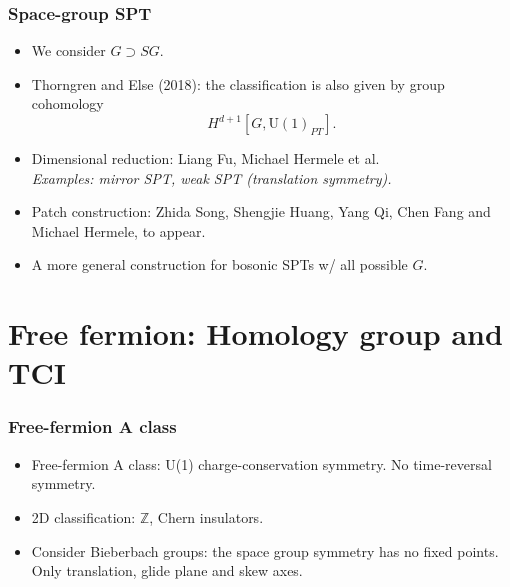 \documentclass[xcolor=table, 10pt, aspectratio=43]{beamer}
\newcommand{\uone}{\mathrm U(1)}
\begin{document}
\begin{frame}
\frametitle{Space-group SPT}
\begin{itemize}
\item We consider $G\supset SG$.
\item Thorngren and Else (2018): the classification is also given by group cohomology
\[H^{d+1}[G, \uone_{PT}].\]
\item Dimensional reduction: Liang Fu, Michael Hermele et al.\\
\emph{Examples: mirror SPT, weak SPT (translation symmetry).}
\item Patch construction: Zhida Song, Shengjie Huang, Yang Qi, Chen Fang and Michael Hermele, to appear.
\item A more general construction for bosonic SPTs w/ all possible $G$.
\end{itemize}
\begin{center}
\hspace{2em}
\end{center}
\end{frame}

\section{Free fermion: Homology group and TCI}

\begin{frame}
\frametitle{Free-fermion A class}
\begin{itemize}
\item Free-fermion A class: U(1) charge-conservation symmetry. No time-reversal symmetry.
\item 2D classification: $\mathbb Z$, Chern insulators.
\item Consider Bieberbach groups: the space group symmetry has no fixed points.\\
Only translation, glide plane and skew axes.
\end{itemize}
\end{frame}
\end{document}
